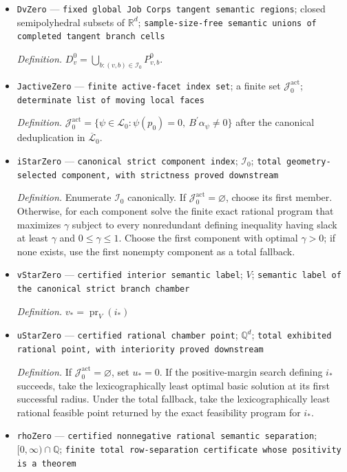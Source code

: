 \documentclass{article}
\begin{document}
\begin{itemize}
  \item \texttt{DvZero} --- \texttt{fixed global Job Corps tangent semantic regions}; closed semipolyhedral subsets of \(\mathbb R^d\); \texttt{sample-\allowbreak{}size-\allowbreak{}free semantic unions of completed tangent branch cells}
  \par\smallskip\noindent\emph{Definition.} \(D_v^0=\bigcup_{b:(v,b)\in\mathcal I_0}P_{v,b}^0\).
  \item \texttt{JactiveZero} --- \texttt{finite active-\allowbreak{}facet index set}; a finite set \(\mathcal J_0^{\mathrm{act}}\); \texttt{determinate list of moving local faces}
  \par\smallskip\noindent\emph{Definition.} \(\mathcal J_0^{\mathrm{act}}=\{\psi\in\mathscr L_0:\psi(p_0)=0,\ B^{\prime}\alpha_{\psi}\ne0\}\) after the canonical deduplication in \(\overline{\mathscr L}_0\).
  \item \texttt{iStarZero} --- \texttt{canonical strict component index}; \(\mathcal I_0\); \texttt{total geometry-\allowbreak{}selected component,\allowbreak{} with strictness proved downstream}
  \par\smallskip\noindent\emph{Definition.} Enumerate \(\mathcal I_0\) canonically. If \(\mathcal J_0^{\mathrm{act}}=\varnothing\), choose its first member. Otherwise, for each component solve the finite exact rational program that maximizes \(\gamma\) subject to every nonredundant defining inequality having slack at least \(\gamma\) and \(0\le\gamma\le1\). Choose the first component with optimal \(\gamma>0\); if none exists, use the first nonempty component as a total fallback.
  \item \texttt{vStarZero} --- \texttt{certified interior semantic label}; \(V\); \texttt{semantic label of the canonical strict branch chamber}
  \par\smallskip\noindent\emph{Definition.} \(v_*=\operatorname{pr}_V(i_*)\)
  \item \texttt{uStarZero} --- \texttt{certified rational chamber point}; \(\mathbb Q^d\); \texttt{total exhibited rational point,\allowbreak{} with interiority proved downstream}
  \par\smallskip\noindent\emph{Definition.} If \(\mathcal J_0^{\mathrm{act}}=\varnothing\), set \(u_*=0\). If the positive-margin search defining \(i_*\) succeeds, take the lexicographically least optimal basic solution at its first successful radius. Under the total fallback, take the lexicographically least rational feasible point returned by the exact feasibility program for \(i_*\).
  \item \texttt{rhoZero} --- \texttt{certified nonnegative rational semantic separation}; \([0,\infty)\cap\mathbb Q\); \texttt{finite total row-\allowbreak{}separation certificate whose positivity is a theorem}

\end{itemize}
\end{document}
